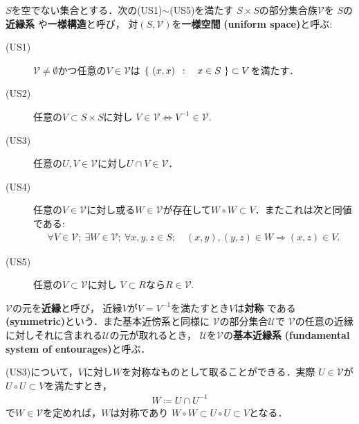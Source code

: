 	\begin{screen}
		\begin{dfn}[近縁系]\label{dfn:uniform_structure}
			$S$を空でない集合とする．次の(US1)$\sim$(US5)を満たす
			$S \times S$の部分集合族$\mathscr{V}$を
			$S$の{\bf 近縁系}
			や{\bf 一様構造}と呼び，
			対$(S,\mathscr{V})$を{\bf 一様空間}
			{\bf (uniform space)}と呼ぶ:
			\begin{description}
				\item[(US1)] $\mathscr{V} \neq \emptyset$かつ任意の$V \in \mathscr{V}$は
					$\left\{\ (x,x)\ \, : \quad x \in S\ \right\} \subset V$を満たす．
					
				\item[(US2)] 任意の$V \subset S \times S$に対し
					$V \in \mathscr{V} \Longleftrightarrow V^{-1} \in \mathscr{V}$.
				\item[(US3)] 任意の$U,V \in \mathscr{V}$に対し$U \cap V \in \mathscr{V}$．
				\item[(US4)] 任意の$V \in \mathscr{V}$に対し或る$W \in \mathscr{V}$が存在して$W \circ W \subset V$．またこれは次と同値である:
					\begin{align}
						\forall V \in \mathscr{V};\ 
						\exists W \in \mathscr{V};\ 
						\forall x,y,z \in S;\quad
						(x,y),(y,z) \in W \Longrightarrow (x,z) \in V.
					\end{align}
					
				\item[(US5)] 任意の$V \subset \mathscr{V}$に対し
					$V \subset R$なら$R \in \mathscr{V}$.
			\end{description}
			$\mathscr{V}$の元を{\bf 近縁}と呼び，
			近縁$V$が$V = V^{-1}$を満たすとき$V$は{\bf 対称}
			である{\bf (symmetric)}という．また基本近傍系と同様に
			$\mathscr{V}$の部分集合$\mathscr{U}$で
			$\mathscr{V}$の任意の近縁に対しそれに含まれる$\mathscr{U}$の元が取れるとき，
			$\mathscr{U}$を$\mathscr{V}$の{\bf 基本近縁系}
			\index{きほんきんえんけい@基本近縁系}
			{\bf (fundamental system of entourages)}と呼ぶ．
		\end{dfn}
	\end{screen}
	(US3)について，$V$に対し$W$を対称なものとして取ることができる．実際
	$U \in \mathscr{V}$が$U \circ U \subset V$を満たすとき，
	\begin{align}
		W \coloneqq U \cap U^{-1}
	\end{align}
	で$W \in \mathscr{V}$を定めれば，$W$は対称であり
	$W \circ W \subset U \circ U \subset V$となる．
	
